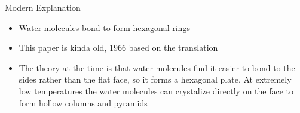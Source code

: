 \documentclass{report}
\begin{document}
{\large Modern Explanation}
\begin{itemize}
    \item Water molecules bond to form hexagonal rings
    \item This paper is kinda old, 1966 based on the
        translation
    \item The theory at the time is that water molecules
        find it easier to bond to the sides rather than
        the flat face, so it forms a hexagonal plate.
        At extremely low temperatures the water molecules
        can crystalize directly on the face to form
        hollow columns and pyramids
\end{itemize}
\end{document}
